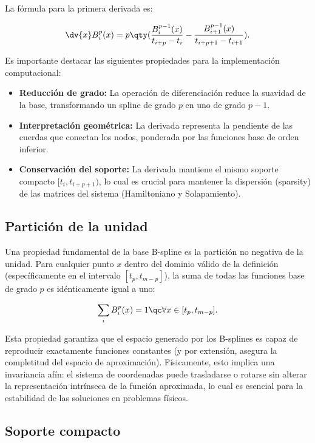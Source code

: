 La fórmula para la primera derivada es:

\[ \dv{x} B_i^p(x) = p \qty( \frac{B_i^{p-1}(x)}{t_{i+p}-t_i} - \frac{B_{i+1}^{p-1}(x)}{t_{i+p+1}-t_{i+1}} ). \]

Es importante destacar las siguientes propiedades para la implementación computacional:
\begin{itemize}
\item \textbf{Reducción de grado:} La operación de diferenciación reduce la suavidad de la base, transformando un spline de grado \( p \) en uno de grado \( p-1 \).
\item \textbf{Interpretación geométrica:} La derivada representa la pendiente de las cuerdas que conectan los nodos, ponderada por las funciones base de orden inferior.
\item \textbf{Conservación del soporte:} La derivada mantiene el mismo soporte compacto \( [t_i, t_{i+p+1}) \), lo cual es crucial para mantener la dispersión (sparsity) de las matrices del sistema (Hamiltoniano y Solapamiento).
\end{itemize}

\subsection{Partición de la unidad}

Una propiedad fundamental de la base B-spline es la partición no negativa de la unidad. Para cualquier punto \( x \) dentro del dominio válido de la definición (específicamente en el intervalo \( [t_p,t_{m-p}] \)), la suma de todas las funciones base de grado \( p \) es idénticamente igual a uno:

\begin{equation}
  \label{eq:part-unity}
  \sum_{i}B_i^p(x) = 1 \qc \forall x \in [t_p, t_{m-p}].
\end{equation}

Esta propiedad garantiza que el espacio generado por los B-splines es capaz de reproducir exactamente funciones constantes (y por extensión, asegura la completitud del espacio de aproximación). Físicamente, esto implica una invariancia afín: el sistema de coordenadas puede trasladarse o rotarse sin alterar la representación intrínseca de la función aproximada, lo cual es esencial para la estabilidad de las soluciones en problemas físicos.

\subsection{Soporte compacto}

